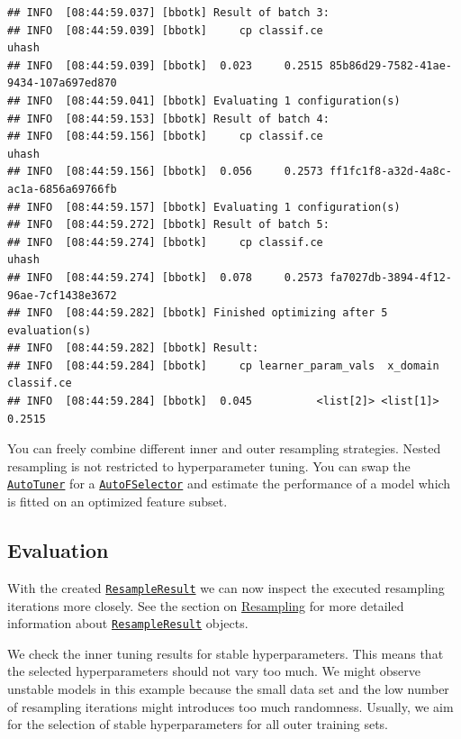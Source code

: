 \documentclass[
]{scrbook}
\begin{document}
\begin{verbatim}
## INFO  [08:44:59.037] [bbotk] Result of batch 3: 
## INFO  [08:44:59.039] [bbotk]     cp classif.ce                                uhash 
## INFO  [08:44:59.039] [bbotk]  0.023     0.2515 85b86d29-7582-41ae-9434-107a697ed870 
## INFO  [08:44:59.041] [bbotk] Evaluating 1 configuration(s) 
## INFO  [08:44:59.153] [bbotk] Result of batch 4: 
## INFO  [08:44:59.156] [bbotk]     cp classif.ce                                uhash 
## INFO  [08:44:59.156] [bbotk]  0.056     0.2573 ff1fc1f8-a32d-4a8c-ac1a-6856a69766fb 
## INFO  [08:44:59.157] [bbotk] Evaluating 1 configuration(s) 
## INFO  [08:44:59.272] [bbotk] Result of batch 5: 
## INFO  [08:44:59.274] [bbotk]     cp classif.ce                                uhash 
## INFO  [08:44:59.274] [bbotk]  0.078     0.2573 fa7027db-3894-4f12-96ae-7cf1438e3672 
## INFO  [08:44:59.282] [bbotk] Finished optimizing after 5 evaluation(s) 
## INFO  [08:44:59.282] [bbotk] Result: 
## INFO  [08:44:59.284] [bbotk]     cp learner_param_vals  x_domain classif.ce 
## INFO  [08:44:59.284] [bbotk]  0.045          <list[2]> <list[1]>     0.2515
\end{verbatim}

You can freely combine different inner and outer resampling strategies.
Nested resampling is not restricted to hyperparameter tuning.
You can swap the \href{https://mlr3tuning.mlr-org.com/reference/AutoTuner.html}{\texttt{AutoTuner}} for a \href{https://mlr3fselect.mlr-org.com/reference/AutoFSelector.html}{\texttt{AutoFSelector}} and estimate the performance of a model which is fitted on an optimized feature subset.

\hypertarget{nested-resamp-eval}{%
\subsection{Evaluation}\label{nested-resamp-eval}}

With the created \href{https://mlr3.mlr-org.com/reference/ResampleResult.html}{\texttt{ResampleResult}} we can now inspect the executed resampling iterations more closely.
See the section on \protect\hyperlink{resampling}{Resampling} for more detailed information about \href{https://mlr3.mlr-org.com/reference/ResampleResult.html}{\texttt{ResampleResult}} objects.

We check the inner tuning results for stable hyperparameters.
This means that the selected hyperparameters should not vary too much.
We might observe unstable models in this example because the small data set and the low number of resampling iterations might introduces too much randomness.
Usually, we aim for the selection of stable hyperparameters for all outer training sets.
\end{document}
